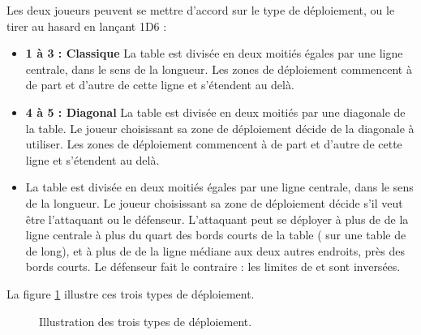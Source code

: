 Les deux joueurs peuvent se mettre d'accord sur le type de déploiement, ou le tirer au hasard en lançant 1D6 :
\begin{itemize}[label={-}]
\item \textbf{1 à 3 : Classique}\newline
La table est divisée en deux moitiés égales par une ligne centrale, dans le sens de la longueur. Les zones de déploiement commencent à  de part et d'autre de cette ligne et s'étendent au delà. 
\item \textbf{4 à 5 : Diagonal}\newline
La table est divisée en deux moitiés par une diagonale de la table. Le joueur choisissant sa zone de déploiement décide de la diagonale à utiliser. Les zones de déploiement commencent à  de part et d'autre de cette ligne et s'étendent au delà.
\item \textbf{}\newline
La table est divisée en deux moitiés égales par une ligne centrale, dans le sens de la longueur. Le joueur choisissant sa zone de déploiement décide s'il veut être l'attaquant ou le défenseur. L'attaquant peut se déployer à plus de  de la ligne centrale à plus du quart des bords courts de la table ( sur une table de  de long), et à plus de  de la ligne médiane aux deux autres endroits, près des bords courts. Le défenseur fait le contraire : les limites de  et  sont inversées.
\end{itemize}

La figure \ref{figure/deployment} illustre ces trois types de déploiement.

\newcommand{\deploymentfigClassic}{CLASSIQUE}
\newcommand{\deploymentfigDiagonal}{DIAGONAL}
\newcommand{\deploymentfigFlankattack}{CONTOURNEMENT}
\newcommand{\deploymentfigAttacker}{\textit{Attaquant}}
\newcommand{\deploymentfigDefender}{\textit{Défenseur}}
\begin{figure}[!htbp]
\centering
\def\svgwidth{\textwidth}

\caption{Illustration des trois types de déploiement.}
\label{figure/deployment}
\end{figure}

\subsection[Objectifs secondaires]{}

